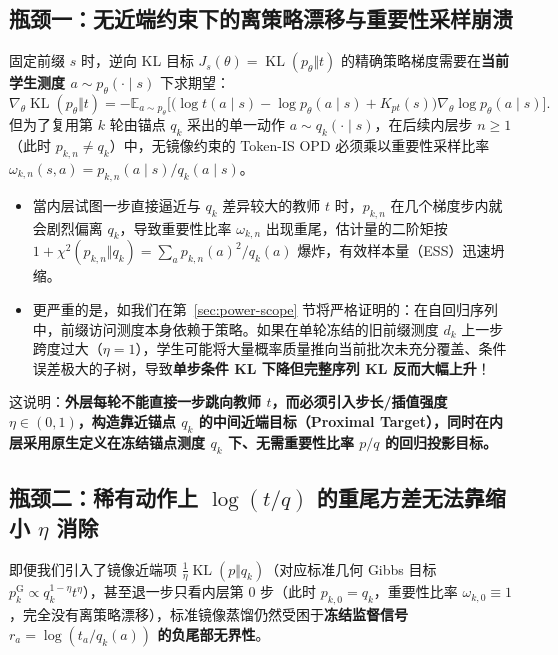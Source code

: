 \documentclass[lang=cn,scheme=chinese,openany]{../book/elegantbook}
\newcommand{\E}{\mathbb E}
\newcommand{\KL}{\operatorname{KL}}
\begin{document}
\subsection{瓶颈一：无近端约束下的离策略漂移与重要性采样崩溃}

固定前缀 $s$ 时，逆向 KL 目标 $J_s(\theta)=\KL(p_\theta\Vert t)$ 的精确策略梯度需要在\textbf{当前学生测度 $a\sim p_\theta(\cdot\mid s)$} 下求期望：
\begin{equation}
 \nabla_\theta\KL(p_\theta\Vert t)
 =-\E_{a\sim p_\theta}\bigl[\bigl(\log t(a\mid s)-\log p_\theta(a\mid s)+K_{pt}(s)\bigr)\nabla_\theta\log p_\theta(a\mid s)\bigr].
\end{equation}
但为了复用第 $k$ 轮由锚点 $q_k$ 采出的单一动作 $a\sim q_k(\cdot\mid s)$，在后续内层步 $n\ge 1$（此时 $p_{k,n}\ne q_k$）中，无镜像约束的 Token-IS OPD 必须乘以重要性采样比率 $\omega_{k,n}(s,a)=p_{k,n}(a\mid s)/q_k(a\mid s)$。
\begin{itemize}
\item 當内层试图一步直接逼近与 $q_k$ 差异较大的教师 $t$ 时，$p_{k,n}$ 在几个梯度步内就会剧烈偏离 $q_k$，导致重要性比率 $\omega_{k,n}$ 出现重尾，估计量的二阶矩按 $1+\chi^2(p_{k,n}\Vert q_k)=\sum_a p_{k,n}(a)^2/q_k(a)$ 爆炸，有效样本量（ESS）迅速坍缩。
\item 更严重的是，如我们在第~\ref{sec:power-scope} 节将严格证明的：在自回归序列中，前缀访问测度本身依赖于策略。如果在单轮冻结的旧前缀测度 $d_k$ 上一步跨度过大（$\eta=1$），学生可能将大量概率质量推向当前批次未充分覆盖、条件误差极大的子树，导致\textbf{单步条件 KL 下降但完整序列 KL 反而大幅上升}！
\end{itemize}
这说明：\textbf{外层每轮不能直接一步跳向教师 $t$，而必须引入步长/插值强度 $\eta\in(0,1)$，构造靠近锚点 $q_k$ 的中间近端目标（Proximal Target），同时在内层采用原生定义在冻结锚点测度 $q_k$ 下、无需重要性比率 $p/q$ 的回归投影目标。}

\subsection{瓶颈二：稀有动作上 \texorpdfstring{$\log(t/q)$}{log(t/q)} 的重尾方差无法靠缩小 \texorpdfstring{$\eta$}{eta} 消除}

即便我们引入了镜像近端项 $\frac1\eta\KL(p\Vert q_k)$（对应标准几何 Gibbs 目标 $p_k^{\mathrm G}\propto q_k^{1-\eta}t^\eta$），甚至退一步只看内层第 $0$ 步（此时 $p_{k,0}=q_k$，重要性比率 $\omega_{k,0}\equiv 1$，完全没有离策略漂移），标准镜像蒸馏仍然受困于\textbf{冻结监督信号 $r_a=\log(t_a/q_k(a))$ 的负尾部无界性}。
\end{document}
